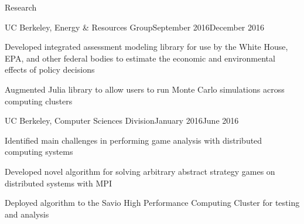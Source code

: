 \documentclass{resume} %
\begin{document}
\begin{rSection}{Research}
\begin{rSubsection}{UC Berkeley, Energy \& Resources Group}{September 2016\textminus December 2016}{}{}
\item[] Developed integrated assessment modeling library for use by the White House, EPA, and other federal bodies to estimate the economic and environmental effects of policy decisions 
\item[] Augmented Julia library to allow users to run Monte Carlo simulations across computing clusters
\end{rSubsection}
\begin{rSubsection}{UC Berkeley, Computer Sciences Division}{January 2016\textminus June 2016}{}{}
\item[] Identified main challenges in performing game analysis with distributed computing systems
\item[] Developed novel algorithm for solving arbitrary abstract strategy games on distributed systems with MPI
\item[] Deployed algorithm to the Savio High Performance Computing Cluster for testing and analysis
\end{rSubsection}
\end{rSection}


%



\end{document}
